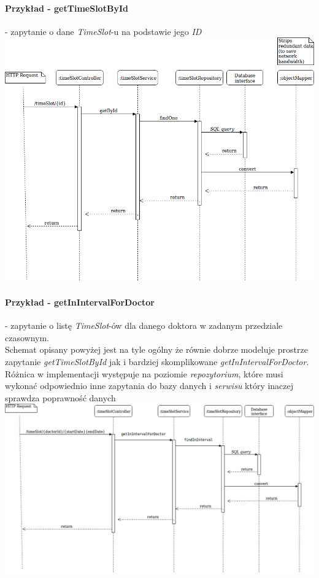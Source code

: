 \documentclass[polish,12pt]{aghthesis}
\begin{document}
\paragraph{Przykład - getTimeSlotById} - zapytanie o dane \emph{TimeSlot}-u na podstawie jego \emph{ID}
\includegraphics[width=\textwidth]{timeSlotById}

\paragraph{Przykład - getInIntervalForDoctor} - zapytanie o listę \emph{TimeSlot}-ów dla danego doktora w zadanym przedziale czasownym. \\
Schemat opisany powyżej jest na tyle ogólny że równie dobrze modeluje prostrze zapytanie \emph{getTimeSlotById} jak i bardziej skomplikowane \emph{getInIntervalForDoctor}. Różnica w implementacji występuje na poziomie \emph{repozytorium}, które musi wykonać odpowiednio inne zapytania do bazy danych i \emph{serwisu} który inaczej sprawdza poprawność danych
\includegraphics[width=\textwidth]{inIntervalDorDoctor}
\end{document}
